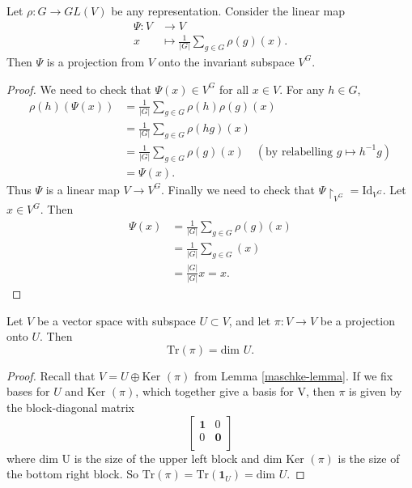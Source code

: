 \begin{lemma}
Let $\rho \colon G \to GL(V)$ be any representation.  Consider the linear map 
\begin{align*}
\Psi \colon V &\to V \\
x &\mapsto \frac{1}{|G|} \sum_{g \in G} \rho(g)(x).
\end{align*}
Then $\Psi$ is a  projection from $V$ onto the invariant subspace $V^G$.
\end{lemma}
\begin{proof}
We need to check that $\Psi(x) \in V^G$ for all $x \in V$.  For any $h \in G$, 
\begin{align*}
\rho(h)(\Psi(x)) &= \frac{1}{|G|}  \sum_{g \in G} \rho(h)\rho(g)(x) \\
&= \frac{1}{|G|}\sum_{g \in G} \rho(h g) (x) \\
&= \frac{1}{|G|} \sum_{g \in G} \rho(g)(x) \quad (\text{by relabelling } g \mapsto h^{-1}g) \\
&= \Psi(x).
\end{align*}
Thus $\Psi$ is a linear map $V \to V^G$.  Finally we need to check that $\Psi \restriction_{V^G} = \text{Id}_{V^G}$.  Let $x \in V^G$.  Then
\begin{align*}
\Psi(x) &= \frac{1}{|G|} \sum_{g \in G} \rho(g)(x) \\
&= \frac{1}{|G|} \sum_{g \in G} (x) \\
&= \frac{|G|}{|G|} x= x.
\end{align*}
\end{proof}

\begin{lemma} \label{projection-lemma}
Let $V$ be a vector space with subspace $U \subset V$, and let $\pi \colon V \to V$ be a projection onto $U$.  Then 
\[ \text{Tr}(\pi) = \text{dim } U. \]
\end{lemma}
\begin{proof}
Recall that $V = U \oplus \text{Ker }(\pi)$ from Lemma \ref{maschke-lemma}. If we fix bases for $U$ and $\text{Ker }(\pi)$, which together give a basis for V, then $\pi$ is given by the block-diagonal matrix
\[   \begin{bmatrix}
\mathbf{1} & 0 \\
0 & \mathbf{0} \\
\end{bmatrix} \]
where $\text{dim U}$ is the size of the upper left block and $\text{dim Ker }(\pi)$ is the size of the bottom right block.  So $\text{Tr}(\pi) = \text{Tr}(\mathbf{1}_U) = \text{dim } U$.
\end{proof}

